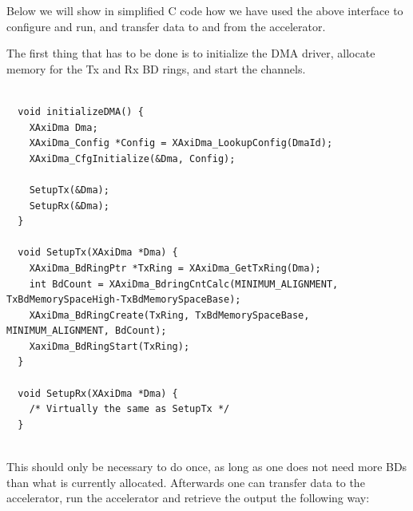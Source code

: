 Below we will show in simplified C code how we have used the above interface to configure and run, and transfer data to and from the accelerator. 

The first thing that has to be done is to initialize the DMA driver, allocate memory for the Tx and Rx BD rings, and start the channels.

\begin{lstlisting}

  void initializeDMA() {
    XAxiDma Dma;
    XAxiDma_Config *Config = XAxiDma_LookupConfig(DmaId);
    XAxiDma_CfgInitialize(&Dma, Config);

    SetupTx(&Dma);
    SetupRx(&Dma);
  }

  void SetupTx(XAxiDma *Dma) {
    XAxiDma_BdRingPtr *TxRing = XAxiDma_GetTxRing(Dma);
    int BdCount = XAxiDma_BdringCntCalc(MINIMUM_ALIGNMENT, TxBdMemorySpaceHigh-TxBdMemorySpaceBase);
    XAxiDma_BdRingCreate(TxRing, TxBdMemorySpaceBase, MINIMUM_ALIGNMENT, BdCount);
    XaxiDma_BdRingStart(TxRing);
  }

  void SetupRx(XAxiDma *Dma) {
    /* Virtually the same as SetupTx */
  }
  
\end{lstlisting}

This should only be necessary to do once, as long as one does not need more BDs than what is currently allocated. Afterwards one can transfer data to the accelerator, run the accelerator and retrieve the output the following way: 

